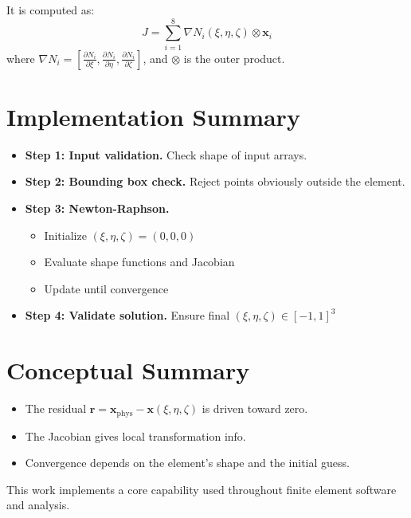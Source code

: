 \documentclass[letterpaper, 11pt]{article}
\begin{document}
		It is computed as:
		\[
		J = \sum_{i=1}^8 \nabla N_i(\xi, \eta, \zeta) \otimes \mathbf{x}_i
		\]
		where \(\nabla N_i = \left[\frac{\partial N_i}{\partial \xi}, \frac{\partial N_i}{\partial \eta}, \frac{\partial N_i}{\partial \zeta} \right]\), and \(\otimes\) is the outer product.
		
		\section*{Implementation Summary}
		\begin{itemize}
			\item \textbf{Step 1: Input validation.} Check shape of input arrays.
			\item \textbf{Step 2: Bounding box check.} Reject points obviously outside the element.
			\item \textbf{Step 3: Newton-Raphson.}
			\begin{itemize}
				\item Initialize \((\xi, \eta, \zeta) = (0, 0, 0)\)
				\item Evaluate shape functions and Jacobian
				\item Update until convergence
			\end{itemize}
			\item \textbf{Step 4: Validate solution.} Ensure final \((\xi, \eta, \zeta) \in [-1, 1]^3\)
		\end{itemize}
		
		\section*{Conceptual Summary}
		\begin{itemize}
			\item The residual \(\mathbf{r} = \mathbf{x}_{\text{phys}} - \mathbf{x}(\xi, \eta, \zeta)\) is driven toward zero.
			\item The Jacobian gives local transformation info.
			\item Convergence depends on the element’s shape and the initial guess.
		\end{itemize}
		
		This work implements a core capability used throughout finite element software and analysis.
		
	
\end{document}
